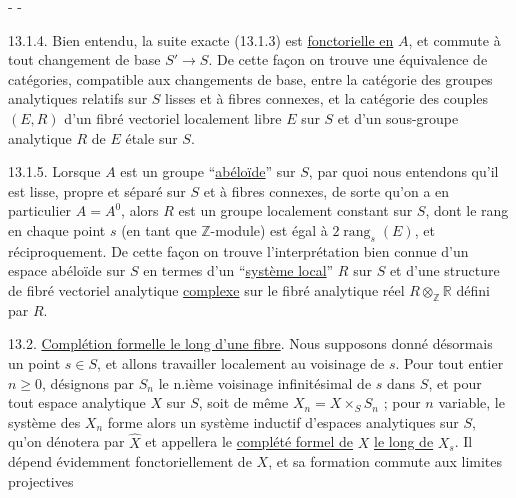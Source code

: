 \begin{center}-  -\end{center}
13.1.4. Bien entendu, la suite exacte (13.1.3) est \uline{fonctorielle en} $A$, et commute à tout changement de base $S'\longrightarrow S$. De cette façon on trouve une équivalence de catégories, compatible aux changements de base, entre la catégorie des groupes analytiques relatifs sur $S$ lisses et à fibres connexes, et la catégorie des couples $(E,R)$ d'un fibré vectoriel localement libre $E$ sur $S$ et d'un sous-groupe analytique $R$ de $E$ étale sur $S$.

13.1.5. Lorsque $A$ est un groupe ``\uline{abéloïde}'' sur $S$, par quoi nous entendons qu'il est lisse, propre et séparé sur $S$ et à fibres connexes, de sorte qu'on a en particulier $A=A^0$, alors $R$ est un groupe localement constant sur $S$, dont le rang en chaque point $s$ (en tant que $\mathbb Z$-module) est égal à $2\operatorname{rang}_s(E)$, et réciproquement. De cette façon on trouve l'interprétation bien connue d'un espace abéloïde sur $S$ en termes d'un ``\uline{système local}'' $R$ sur $S$ et d'une structure de fibré vectoriel analytique \uline{complexe} sur le fibré analytique réel $R\otimes_{\mathbb Z}\mathbb R$ défini par $R$.

13.2. \uline{Complétion formelle le long d'une fibre}. Nous supposons donné désormais un point $s\in S$, et allons travailler localement au voisinage de $s$. Pour tout entier $n\geq0$, désignons par $S_n$ le n.ième voisinage infinitésimal de $s$ dans $S$, et pour tout espace analytique $X$ sur $S$, soit de même $X_n=X\times_S S_n$ ; pour $n$ variable, le système des $X_n$ forme alors un système inductif d'espaces analytiques sur $S$, qu'on dénotera par $\widehat X$ et appellera le \uline{complété formel de} $X$ \uline{le long de} $X_s$. Il dépend évidemment fonctoriellement de $X$, et sa formation commute aux limites projectives

